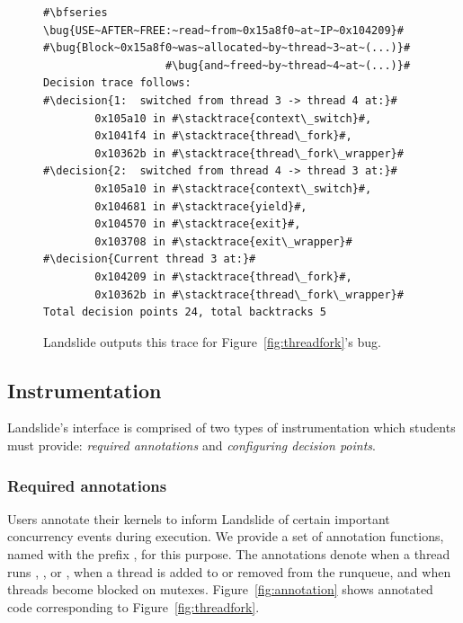 \newcommand\bug[1]{\hilight{red}{#1}}
\newcommand\decision[1]{\bfseries \hilight{olivegreen}{#1}}
\newcommand\stacktrace[1]{\hilight{darkcyan}{#1}}
\begin{figure}[t]
\small
\begin{lstlisting}
#\bfseries \bug{USE~AFTER~FREE:~read~from~0x15a8f0~at~IP~0x104209}#
#\bug{Block~0x15a8f0~was~allocated~by~thread~3~at~(...)}#
                   #\bug{and~freed~by~thread~4~at~(...)}#
Decision trace follows:
#\decision{1:  switched from thread 3 -> thread 4 at:}#
        0x105a10 in #\stacktrace{context\_switch}#,
        0x1041f4 in #\stacktrace{thread\_fork}#,
        0x10362b in #\stacktrace{thread\_fork\_wrapper}#
#\decision{2:  switched from thread 4 -> thread 3 at:}#
        0x105a10 in #\stacktrace{context\_switch}#,
        0x104681 in #\stacktrace{yield}#,
        0x104570 in #\stacktrace{exit}#,
        0x103708 in #\stacktrace{exit\_wrapper}#
#\decision{Current thread 3 at:}#
        0x104209 in #\stacktrace{thread\_fork}#,
        0x10362b in #\stacktrace{thread\_fork\_wrapper}#
Total decision points 24, total backtracks 5
\end{lstlisting}
\caption{Landslide outputs this trace for Figure~\ref{fig:threadfork}'s bug.}
\label{fig:trace}
\end{figure}

\subsection{Instrumentation}
\label{sec:instrument}

Landslide's interface is comprised of two types of instrumentation which students must provide: {\em required annotations} and {\em configuring decision points}.

\subsubsection{Required annotations}
Users annotate their kernels to inform Landslide of certain important concurrency events during execution. We provide a set of annotation functions, named with the prefix , for this purpose. The annotations denote when a thread runs , , or , when a thread is added to or removed from the runqueue, and when threads become blocked on mutexes.
Figure~\ref{fig:annotation} shows annotated code corresponding to Figure~\ref{fig:threadfork}.

